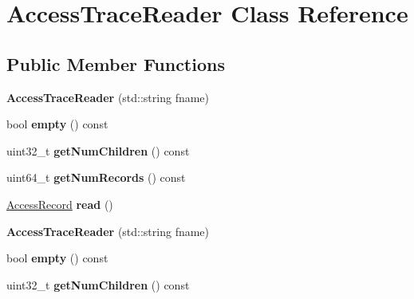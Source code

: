 \hypertarget{classAccessTraceReader}{\section{Access\-Trace\-Reader Class Reference}
\label{classAccessTraceReader}
}
\subsection*{Public Member Functions}
\begin{DoxyCompactItemize}
\item 
\hypertarget{classAccessTraceReader_a82e1f16076492d03edc1347eae753029}{{\bfseries Access\-Trace\-Reader} (std\-::string fname)}\label{classAccessTraceReader_a82e1f16076492d03edc1347eae753029}

\item 
\hypertarget{classAccessTraceReader_aae0da4bbfadad6f563a90fa5179afd15}{bool {\bfseries empty} () const }\label{classAccessTraceReader_aae0da4bbfadad6f563a90fa5179afd15}

\item 
\hypertarget{classAccessTraceReader_a8253d0764d05a21f79a2c508fc88593e}{uint32\-\_\-t {\bfseries get\-Num\-Children} () const }\label{classAccessTraceReader_a8253d0764d05a21f79a2c508fc88593e}

\item 
\hypertarget{classAccessTraceReader_a615bdd807251b7177d5112caefb04ba0}{uint64\-\_\-t {\bfseries get\-Num\-Records} () const }\label{classAccessTraceReader_a615bdd807251b7177d5112caefb04ba0}

\item 
\hypertarget{classAccessTraceReader_a344dae9e9818665d382681daae002f1e}{\hyperlink{structAccessRecord}{Access\-Record} {\bfseries read} ()}\label{classAccessTraceReader_a344dae9e9818665d382681daae002f1e}

\item 
\hypertarget{classAccessTraceReader_a82e1f16076492d03edc1347eae753029}{{\bfseries Access\-Trace\-Reader} (std\-::string fname)}\label{classAccessTraceReader_a82e1f16076492d03edc1347eae753029}

\item 
\hypertarget{classAccessTraceReader_aae0da4bbfadad6f563a90fa5179afd15}{bool {\bfseries empty} () const }\label{classAccessTraceReader_aae0da4bbfadad6f563a90fa5179afd15}

\item 
\hypertarget{classAccessTraceReader_a8253d0764d05a21f79a2c508fc88593e}{uint32\-\_\-t {\bfseries get\-Num\-Children} () const }\label{classAccessTraceReader_a8253d0764d05a21f79a2c508fc88593e}


\end{DoxyCompactItemize}
